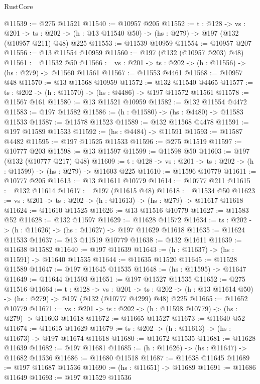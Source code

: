 \begin{lexlean}{RustCore}
\begin{coremodule}
@11539 := @275 @11521
@11540 := @10957 @205
@11552 := {t : @128} ->
  {vs : @201} ->
  {ts : @202} -> (h : @13 @11540 @50) -> (hs : @279) -> @197 (@132 (@10957 @211) @48) @225
@11553 := @11539 @10959
@11554 := @10957 @207
@11556 := @13 @11554 @10959
@11560 := @197 (@132 (@10957 @203) @48)
@11561 := @11532 @50
@11566 := {vs : @201} -> {ts : @202} -> (h : @11556) -> (hs : @279) -> @11560 @11561
@11567 := @11553 @4461
@11568 := @10957 @48
@11570 := @13 @11568 @10959
@11572 := @132 @11540 @4465
@11577 := {ts : @202} -> (h : @11570) -> (hs : @4486) -> @197 @11572 @11561
@11578 := @11567 @161
@11580 := @13 @11521 @10959
@11582 := @132 @11554 @4472
@11583 := @197 @11582
@11586 := (h : @11580) -> (hs : @4480) -> @11583 @11533
@11587 := @11578 @11523
@11589 := @132 @11568 @4478
@11591 := @197 @11589 @11533
@11592 := (hs : @4484) -> @11591
@11593 := @11587 @4482
@11595 := @197 @11525 @11533
@11596 := @275 @11519
@11597 := @10777 @203
@11598 := @13 @11597
@11599 := @11598 @50
@11603 := @197 (@132 (@10777 @217) @48)
@11609 := {t : @128} -> {vs : @201} -> {ts : @202} -> (h : @11599) -> (hs : @279) -> @11603 @225
@11610 := @11596 @10779
@11611 := @10777 @205
@11613 := @13 @11611 @10779
@11614 := @10777 @211
@11615 := @132 @11614
@11617 := @197 (@11615 @48)
@11618 := @11534 @50
@11623 := {vs : @201} -> {ts : @202} -> (h : @11613) -> (hs : @279) -> @11617 @11618
@11624 := @11610 @11525
@11626 := @13 @11516 @10779
@11627 := @11583 @52
@11628 := @132 @11597
@11629 := @11628 @11572
@11634 := {ts : @202} -> (h : @11626) -> (hs : @11627) -> @197 @11629 @11618
@11635 := @11624 @11533
@11637 := @13 @11519 @10779
@11638 := @132 @11611
@11639 := @11638 @11582
@11640 := @197 @11639
@11643 := (h : @11637) -> (hs : @11591) -> @11640 @11535
@11644 := @11635 @11520
@11645 := @11528 @11589
@11647 := @197 @11645 @11535
@11648 := (hs : @11595) -> @11647
@11649 := @11644 @11593
@11651 := @197 @11527 @11535
@11652 := @275 @11516
@11664 := {t : @128} ->
  {vs : @201} ->
  {ts : @202} -> (h : @13 @11614 @50) -> (hs : @279) -> @197 (@132 (@10777 @4299) @48) @225
@11665 := @11652 @10779
@11671 := {vs : @201} -> {ts : @202} -> (h : @11598 @10779) -> (hs : @279) -> @11603 @11618
@11672 := @11665 @11527
@11673 := @11640 @52
@11674 := @11615 @11629
@11679 := {ts : @202} -> (h : @11613) -> (hs : @11673) -> @197 @11674 @11618
@11680 := @11672 @11535
@11681 := @11628 @11639
@11682 := @197 @11681
@11685 := (h : @11626) -> (hs : @11647) -> @11682 @11536
@11686 := @11680 @11518
@11687 := @11638 @11645
@11689 := @197 @11687 @11536
@11690 := (hs : @11651) -> @11689
@11691 := @11686 @11649
@11693 := @197 @11529 @11536

\end{coremodule}
\end{lexlean}
